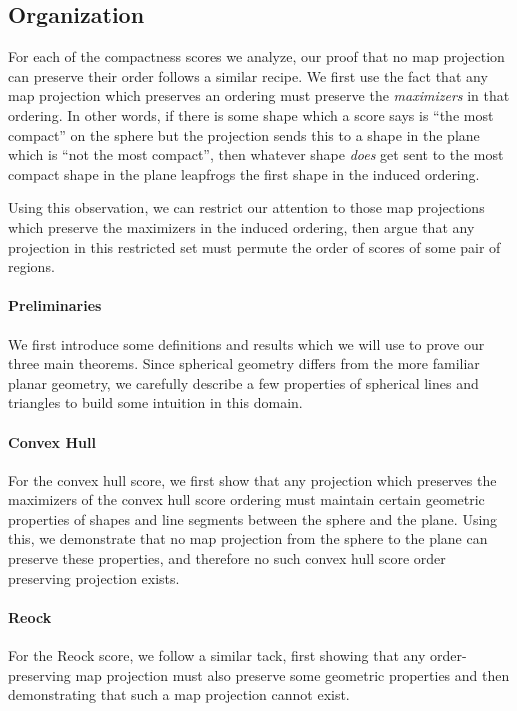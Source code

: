\subsection{Organization}


For each of the compactness scores we analyze, our proof that no map
projection can preserve their order follows a similar recipe. We
first use the fact that any map projection which preserves an ordering
must preserve the \textit{maximizers} in that ordering.  In other words,
if there is some shape which a score says is \enquote{the most compact} on the sphere 
but the projection sends this to a shape in the plane which is \enquote{not the most compact}, then whatever 
shape \textit{does} get sent to the most compact shape in the plane leapfrogs 
the first shape in the induced ordering.

Using this observation, we can restrict our attention to those map
projections which preserve the maximizers in the induced ordering,
then argue that any projection in this restricted set must permute the
order of scores of some pair of regions.


\paragraph{Preliminaries}
We first introduce some definitions and results which we will use to prove our 
three main theorems.  Since spherical geometry differs from the more familiar planar geometry, 
we carefully describe a few properties of spherical lines and triangles to build some intuition 
in this domain. 


\paragraph{Convex Hull}
For the convex hull score, we first 
show that any projection which preserves the maximizers of the convex hull score 
ordering must maintain certain geometric properties of shapes and line segments 
between the sphere and the plane.  Using this, we demonstrate that no 
map projection from the sphere to the plane can preserve these properties, and therefore 
no such convex hull score order preserving projection exists.



\paragraph{Reock}
For the Reock score, we follow a similar tack, first showing that any 
order-preserving map projection must also preserve some geometric properties 
and then demonstrating that such a map projection cannot exist.





